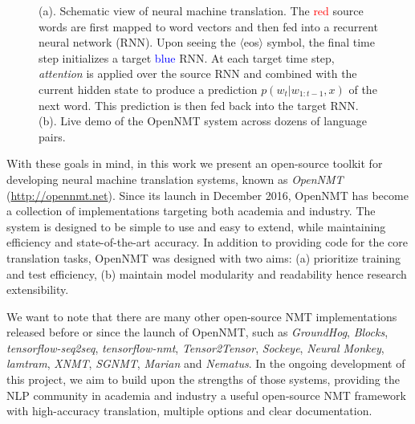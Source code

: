 \documentclass[]{article}
\begin{document}
\begin{figure}[t]
  \centering
  \caption{\small (a). Schematic view of neural machine translation. The \textcolor{red}{red} source words are first mapped to word vectors and then fed into a recurrent neural network (RNN). Upon seeing the $\langle$eos$\rangle$ symbol, the final time step initializes a target \textcolor{blue}{blue} RNN. At each target time step, \textit{attention} is applied over the source RNN and combined with the current hidden state to produce a prediction $p(w_t| w_{1: t-1}, x)$ of the next word. This prediction is then fed back into the target RNN. (b). Live demo of the OpenNMT system across dozens of language pairs.}
  \label{fig:ab}
\end{figure}

With these goals in mind, in this work we present an open-source toolkit for developing
neural machine translation systems, known as \textit{OpenNMT} (\url{http://opennmt.net}). Since its launch in December 2016, OpenNMT has become a collection of implementations targeting both academia and industry. The system is designed to be simple to use and easy to extend, while maintaining efficiency and state-of-the-art accuracy. In
addition to providing code for the core translation tasks, OpenNMT was
designed with two aims: (a) prioritize training and test
efficiency, (b) maintain model modularity and readability hence research extensibility.

We want to note that there are many other open-source NMT implementations released before or since the launch of OpenNMT, such as \textit{GroundHog},
\textit{Blocks}, \textit{tensorflow-seq2seq}, \textit{tensorflow-nmt}, \textit{Tensor2Tensor}, \textit{Sockeye}, \textit{Neural Monkey}, \textit{lamtram}, \textit{XNMT}, \textit{SGNMT}, \textit{Marian} and \textit{Nematus}. In the ongoing development of this project, we aim to build upon
the strengths of those systems, providing the NLP community in academia and industry a useful open-source NMT framework with high-accuracy translation, multiple options and clear documentation.
\end{document}
